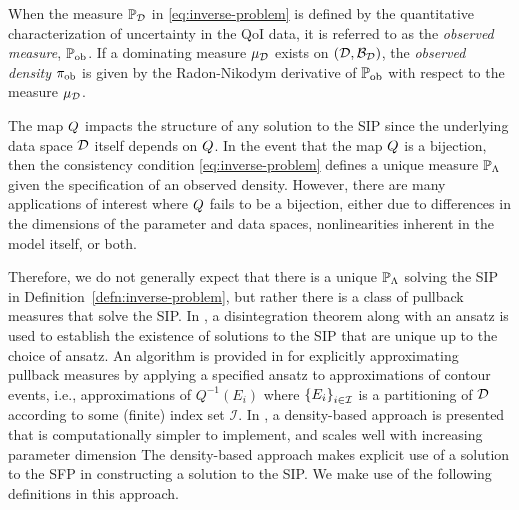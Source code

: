 \begin{defn}\label{defn:observed}
  When the measure $\mathbb{P}_{\mathcal{D}}$ in \eqref{eq:inverse-problem} is defined by the quantitative characterization of uncertainty in the QoI data, it is referred to as the \emph{observed measure}, $\operatorname*{\mathbb{P}_{ob}}$.
  If a dominating measure $\mu_{\mathcal{D}}$ exists on $(\mathcal{D}, \mathcal{B}_{\mathcal{D}})$, the \emph{observed density} $\operatorname*{\pi_{ob}}$ is given by the Radon-Nikodym derivative of $\operatorname*{\mathbb{P}_{ob}}$ with respect to the measure $\mu_{\mathcal{D}}$.
\end{defn}


The map $Q$ impacts the structure of any solution to the SIP since the underlying data space $\mathcal{D}$ itself depends on $Q$.
In the event that the map $Q$ is a bijection, then the consistency condition \eqref{eq:inverse-problem} defines a unique measure $\mathbb{P}_{\Lambda}$ given the specification of an observed density.
However, there are many applications of interest where $Q$ fails to be a bijection, either due to differences in the dimensions of the parameter and data spaces, nonlinearities inherent in the model itself, or both.


Therefore, we do not generally expect that there is a unique $\mathbb{P}_{\Lambda}$ solving the SIP in Definition~\ref{defn:inverse-problem}, but rather there is a class of pullback measures that solve the SIP.
In \cite{BET+14}, a disintegration theorem \citep{Chang_Pollard, Dellacherie_Meyer_book} along with an ansatz is used to establish the existence of solutions to the SIP that are unique up to the choice of ansatz.
An algorithm is provided in \cite{BET+14} for explicitly approximating pullback measures by applying a specified ansatz to approximations of contour events, i.e., approximations of $Q^{-1}(E_i)$ where $\left\{E_i\right\}_{i\in\mathcal{I}}$ is a partitioning of $\mathcal{D}$ according to some (finite) index set $\mathcal{I}$.
In \cite{BJW18a}, a density-based approach is presented that is computationally simpler to implement, and scales well with increasing parameter dimension
The density-based approach makes explicit use of a solution to the SFP in constructing a solution to the SIP.
We make use of the following definitions in this approach.

